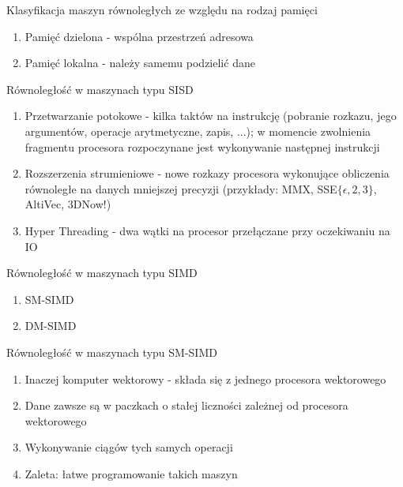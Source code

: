 \documentclass{beamer}
\begin{document}
\begin{frame}{Klasyfikacja maszyn równoległych ze względu na rodzaj pamięci}
  \begin{enumerate}
  \item Pamięć dzielona - wspólna przestrzeń adresowa
  \item Pamięć lokalna - należy samemu podzielić dane
  \end{enumerate}
\end{frame}

\begin{frame}{Równoległość w maszynach typu SISD}
  \begin{enumerate}
  \item Przetwarzanie potokowe - kilka taktów na instrukcję (pobranie rozkazu, jego argumentów, operacje arytmetyczne, zapis, ...); w momencie zwolnienia fragmentu procesora rozpoczynane jest wykonywanie następnej instrukcji
  \item Rozszerzenia strumieniowe - nowe rozkazy procesora wykonujące obliczenia równoległe na danych mniejszej precyzji (przykłady: MMX, SSE$\{\epsilon,2,3\}$, AltiVec, 3DNow!)
  \item Hyper Threading - dwa wątki na procesor przełączane przy oczekiwaniu na IO
  \end{enumerate}
\end{frame}

\begin{frame}{Równoległość w maszynach typu SIMD}
  \begin{enumerate}
  \item SM-SIMD
  \item DM-SIMD
  \end{enumerate}
\end{frame}

\begin{frame}{Równoległość w maszynach typu SM-SIMD}
  \begin{enumerate}
  \item Inaczej komputer wektorowy - składa się z jednego procesora wektorowego
  \item Dane zawsze są w paczkach o stałej liczności zależnej od procesora wektorowego
  \item Wykonywanie ciągów tych samych operacji
  \item Zaleta: łatwe programowanie takich maszyn
  \end{enumerate}
\end{frame}
\end{document}
